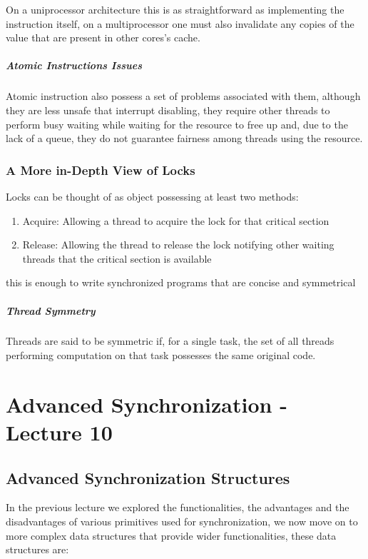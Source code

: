 \documentclass[openright, twoside]{report}
\theoremstyle{definition}
\theoremstyle{example}
\begin{document}
		On a uniprocessor architecture this is as straightforward as implementing the 
		instruction itself, on a multiprocessor one must also invalidate any copies of the 
		value that are present in other cores's cache.

		\paragraph{Atomic Instructions Issues}
		Atomic instruction also possess a set of problems associated with them, although
		they are less unsafe that interrupt disabling, they require other threads to 
		perform busy waiting while waiting for the resource to free up and, due to the 
		lack of a queue, they do not guarantee fairness among threads using the resource.

		\subsection{A More in-Depth View of Locks}
		Locks can be thought of as object possessing at least two methods:
		\begin{enumerate}
			\item Acquire: Allowing a thread to acquire the lock for that critical section
			\item Release: Allowing the thread to release the lock notifying other 
			waiting threads that the critical section is available
		\end{enumerate}
		
		this is enough to write synchronized programs that are concise and symmetrical

			\paragraph{Thread Symmetry}
			Threads are said to be symmetric if, for a single task, the set of all threads 
			performing computation on that task possesses the same original code.
		
\chapter{Advanced Synchronization - Lecture 10}
	\section{Advanced Synchronization Structures}
	\label{sec:sync_struct}
	In the previous lecture we explored the functionalities, the advantages and the 
	disadvantages of various primitives used for synchronization, we now move on 
	to more complex data structures that provide wider functionalities, these 
	data structures are:
\end{document}
